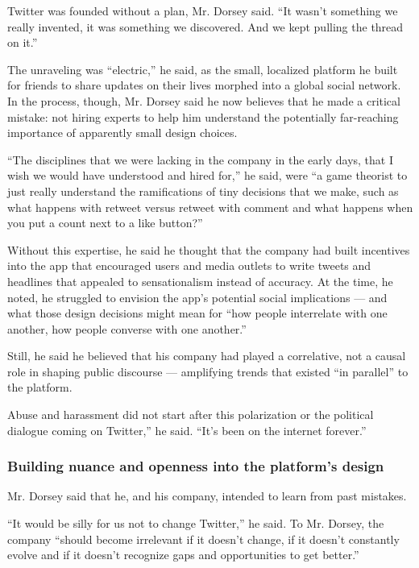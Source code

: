 Twitter was founded without a plan, Mr. Dorsey said. ``It wasn't
something we really invented, it was something we discovered. And we
kept pulling the thread on it.''

The unraveling was ``electric,'' he said, as the small, localized
platform he built for friends to share updates on their lives morphed
into a global social network. In the process, though, Mr. Dorsey said he
now believes that he made a critical mistake: not hiring experts to help
him understand the potentially far-reaching importance of apparently
small design choices.

``The disciplines that we were lacking in the company in the early days,
that I wish we would have understood and hired for,'' he said, were ``a
game theorist to just really understand the ramifications of tiny
decisions that we make, such as what happens with retweet versus retweet
with comment and what happens when you put a count next to a like
button?''

Without this expertise, he said he thought that the company had built
incentives into the app that encouraged users and media outlets to write
tweets and headlines that appealed to sensationalism instead of
accuracy. At the time, he noted, he struggled to envision the app's
potential social implications --- and what those design decisions might
mean for ``how people interrelate with one another, how people converse
with one another.''

Still, he said he believed that his company had played a correlative,
not a causal role in shaping public discourse --- amplifying trends that
existed ``in parallel'' to the platform.

Abuse and harassment did not start after this polarization or the
political dialogue coming on Twitter,'' he said. ``It's been on the
internet forever.''

\hypertarget{building-nuance-and-openness-into-the-platforms-design}{%
\subsubsection{Building nuance and openness into the platform's
design}\label{building-nuance-and-openness-into-the-platforms-design}}

Mr. Dorsey said that he, and his company, intended to learn from past
mistakes.

``It would be silly for us not to change Twitter,'' he said. To Mr.
Dorsey, the company ``should become irrelevant if it doesn't change, if
it doesn't constantly evolve and if it doesn't recognize gaps and
opportunities to get better.''


